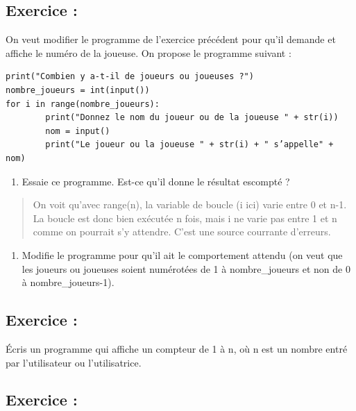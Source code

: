 \documentclass[a4paper,french,11pt]{article}
\providecommand{\tightlist}{%
  \setlength{\itemsep}{0pt}\setlength{\parskip}{0pt}}
\begin{document}
\hypertarget{exercice-12}{%
\subsection{Exercice :}\label{exercice-12}}

On veut modifier le programme de l'exercice précédent pour qu'il demande
et affiche le numéro de la joueuse. On propose le programme suivant :

\begin{verbatim}
print("Combien y a-t-il de joueurs ou joueuses ?")
nombre_joueurs = int(input())
for i in range(nombre_joueurs):
        print("Donnez le nom du joueur ou de la joueuse " + str(i))
        nom = input()
        print("Le joueur ou la joueuse " + str(i) + " s’appelle" + nom)
\end{verbatim}

\begin{enumerate}
\def\labelenumi{\arabic{enumi}.}
\tightlist
\item
  Essaie ce programme. Est-ce qu'il donne le résultat escompté ?
\end{enumerate}

\begin{quote}
On voit qu'avec range(n), la variable de boucle (i ici) varie entre 0 et
n-1. La boucle est donc bien exécutée n fois, mais i ne varie pas entre
1 et n comme on pourrait s'y attendre. C'est une source courrante
d'erreurs.
\end{quote}

\begin{enumerate}
\def\labelenumi{\arabic{enumi}.}
\setcounter{enumi}{1}
\tightlist
\item
  Modifie le programme pour qu'il ait le comportement attendu (on veut
  que les joueurs ou joueuses soient numérotées de 1 à nombre\_joueurs
  et non de 0 à nombre\_joueurs-1).
\end{enumerate}

\hypertarget{exercice-13}{%
\subsection{Exercice :}\label{exercice-13}}

Écris un programme qui affiche un compteur de 1 à n, où n est un nombre
entré par l'utilisateur ou l'utilisatrice.

\hypertarget{exercice-14}{%
\subsection{Exercice :}\label{exercice-14}}
\end{document}
